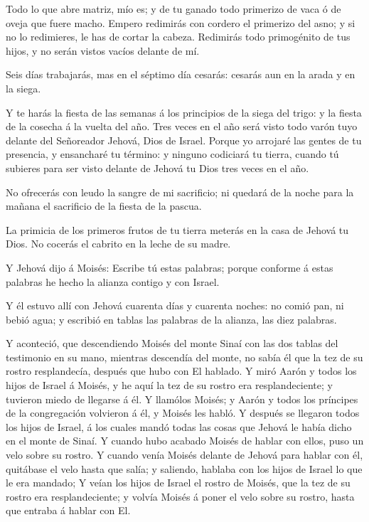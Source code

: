  Todo lo que abre matriz, mío es; y de tu ganado todo
primerizo de vaca ó de oveja que fuere macho.  Empero
redimirás con cordero el primerizo del asno; y si no lo redimieres, le
has de cortar la cabeza. Redimirás todo primogénito de tus hijos, y no
serán vistos vacíos delante de mí.

 Seis días trabajarás, mas en el séptimo día cesarás:
cesarás aun en la arada y en la siega.

 Y te harás la fiesta de las semanas á los principios de la
siega del trigo: y la fiesta de la cosecha á la vuelta del año.
 Tres veces en el año será visto todo varón tuyo delante
del Señoreador Jehová, Dios de Israel.  Porque yo arrojaré
las gentes de tu presencia, y ensancharé tu término: y ninguno codiciará
tu tierra, cuando tú subieres para ser visto delante de Jehová tu Dios
tres veces en el año.

 No ofrecerás con leudo la sangre de mi sacrificio; ni
quedará de la noche para la mañana el sacrificio de la fiesta de la
pascua.

 La primicia de los primeros frutos de tu tierra meterás en
la casa de Jehová tu Dios. No cocerás el cabrito en la leche de su
madre.

 Y Jehová dijo á Moisés: Escribe tú estas palabras; porque
conforme á estas palabras he hecho la alianza contigo y con Israel.

 Y él estuvo allí con Jehová cuarenta días y cuarenta
noches: no comió pan, ni bebió agua; y escribió en tablas las palabras
de la alianza, las diez palabras.

 Y aconteció, que descendiendo Moisés del monte Sinaí con
las dos tablas del testimonio en su mano, mientras descendía del monte,
no sabía él que la tez de su rostro resplandecía, después que hubo con
El hablado.  Y miró Aarón y todos los hijos de Israel á
Moisés, y he aquí la tez de su rostro era resplandeciente; y tuvieron
miedo de llegarse á él.  Y llamólos Moisés; y Aarón y todos
los príncipes de la congregación volvieron á él, y Moisés les habló.
 Y después se llegaron todos los hijos de Israel, á los
cuales mandó todas las cosas que Jehová le había dicho en el monte de
Sinaí.  Y cuando hubo acabado Moisés de hablar con ellos,
puso un velo sobre su rostro.  Y cuando venía Moisés
delante de Jehová para hablar con él, quitábase el velo hasta que salía;
y saliendo, hablaba con los hijos de Israel lo que le era mandado;
 Y veían los hijos de Israel el rostro de Moisés, que la
tez de su rostro era resplandeciente; y volvía Moisés á poner el velo
sobre su rostro, hasta que entraba á hablar con El.

